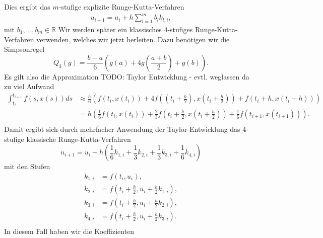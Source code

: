 Dies ergibt das $m$-stufige explizite Runge-Kutta-Verfahren
\begin{align}
    u_{i+1} = u_i + h \sum_{l=1}^{m} b_l k_{l,i},   \label{exp-rk-def}
\end{align}
mit $b_1, \dots, b_m \in \mathbb{R}$
Wir werden später ein klassisches $4$-stufiges Runge-Kutta-Verfahren verwenden, welches wir jetzt herleiten.
Dazu benötigen wir die Simpsonregel
\[
    Q_3(g) = \frac{b-a}{6} (g(a) + 4g(\frac{a+b}{2}) +g(b)).
\]
Es gilt also die Approximation
TODO: Taylor Entwicklung - evtl. weglassen da zu viel Aufwand
\begin{align*}
    \int_{t_i}^{t_{i+1}} f(s,x(s)) ds &\approx
    \frac{h}{6}(f(t_i,x(t_i)) + 4f((t_i + \frac{h}{2}), x(t_i+\frac{h}{2})) + f(t_i + h,x(t_i + h))) \\
    &= h\left(\frac{1}{6}f(t_i,x(t_i)) + \frac{2}{3}f\left( t_i + \frac{h}{2}, x\left( t_i + \frac{h}{2}\right) \right)
    + \frac{1}{6}f(t_{i+1},x(t_{i+1}))\right). \\
\end{align*}
Damit ergibt sich durch mehrfacher Anwendung der Taylor-Entwicklung das 4-stufige klassische Runge-Kutta-Verfahren
\[
    u_{i+1} = u_i + h\left( \frac{1}{6}k_{1,i} + \frac{1}{3} k_{2,i} + \frac{1}{3} k_{3,i} + \frac{1}{6} k_{4,i} \right)
\]
mit den Stufen
\begin{align*}
    k_{1,i} &= f(t_i,u_i), \\
    k_{2,i} &= f(t_i + \frac{h}{2}, u_i + \frac{h}{2}k_{1,i}), \\
    k_{3,i} &= f(t_i + \frac{h}{2}, u_i + \frac{h}{2}k_{2,i}), \\
    k_{4,i} &= f(t_i + \frac{h}{2}, u_i + \frac{h}{2}k_{3,i}). \\
\end{align*}
In diesem Fall haben wir die Koeffizienten

